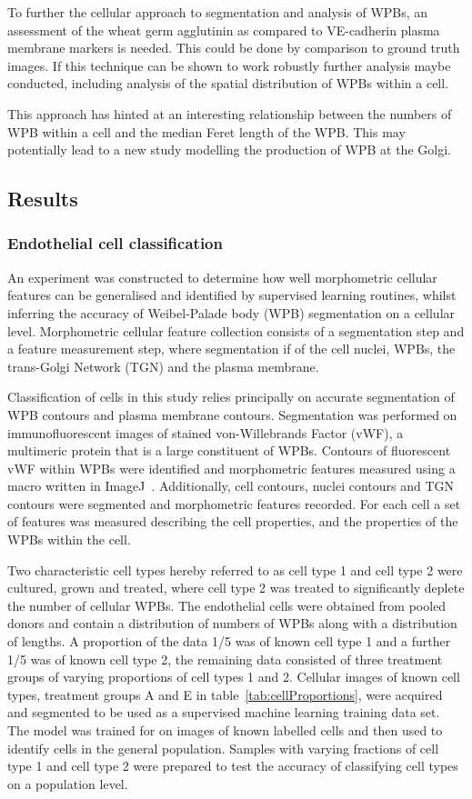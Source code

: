 To further the cellular approach to segmentation and analysis of WPBs, an assessment of the wheat germ agglutinin as compared to VE-cadherin plasma membrane markers is needed. This could be done by comparison to ground truth images. If this technique can be shown to work robustly further analysis maybe conducted, including analysis of the spatial distribution of WPBs within a cell.

This approach has hinted at an interesting relationship between the numbers of WPB within a cell and the median Feret length of the WPB. This may potentially lead to a new study modelling the production of WPB at the Golgi.

\subsection{Results}
\subsubsection{Endothelial cell classification}
An experiment was constructed to determine how well morphometric cellular features can be generalised and identified by supervised learning routines, whilst inferring the accuracy of Weibel-Palade body (WPB) segmentation on a cellular level. Morphometric cellular feature collection consists of a segmentation step and a feature measurement step, where segmentation if of the cell nuclei, WPBs, the trans-Golgi Network (TGN) and the plasma membrane. 

Classification of cells in this study relies principally on accurate segmentation of WPB contours and plasma membrane contours. Segmentation was performed on immunofluorescent images of stained von-Willebrands Factor (vWF), a multimeric protein that is a large constituent of WPBs. Contours of fluorescent vWF within WPBs were identified and morphometric features measured using a macro written in ImageJ~\cite{bb}. Additionally, cell contours, nuclei contours and TGN contours were segmented and morphometric features recorded. For each cell a set of features was measured describing the cell properties, and the properties of the WPBs within the cell. 

Two characteristic cell types hereby referred to as cell type 1 and cell type 2 were cultured, grown and treated, where cell type 2 was treated to significantly deplete the number of cellular WPBs. The endothelial cells were obtained from pooled donors and contain a distribution of numbers of WPBs along with a distribution of lengths. A proportion of the data 1/5 was of known cell type 1 and a further 1/5 was of known cell type 2, the remaining data consisted of three treatment groups of varying proportions of cell types 1 and 2. Cellular images of known cell types, treatment groups A and E in table~\ref{tab:cellProportions}, were acquired and segmented to be used as a supervised machine learning training data set. The model was trained for on images of known labelled cells and then used to identify cells in the general population. Samples with varying fractions of cell type 1 and cell type 2 were prepared to test the accuracy of classifying cell types on a population level.

